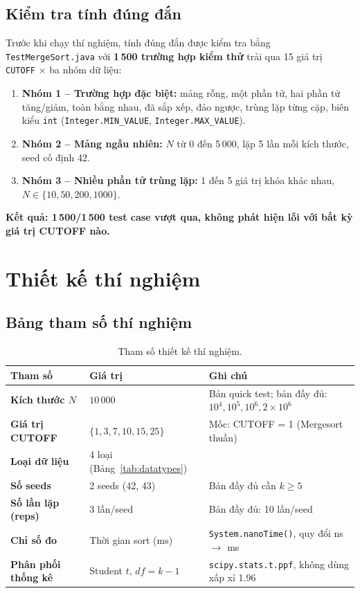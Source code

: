 \documentclass[12pt, a4paper]{article}
\begin{document}
\subsection{Kiểm tra tính đúng đắn}

Trước khi chạy thí nghiệm, tính đúng đắn được kiểm tra bằng
\texttt{TestMergeSort.java} với \textbf{1\,500 trường hợp kiểm thử} trải qua
15 giá trị \texttt{CUTOFF} $\times$ ba nhóm dữ liệu:

\begin{enumerate}
    \item \textbf{Nhóm 1 – Trường hợp đặc biệt:} mảng rỗng, một phần tử, hai
          phần tử tăng/giảm, toàn bằng nhau, đã sắp xếp, đảo ngược, trùng lặp
          từng cặp, biên kiểu \texttt{int} (\texttt{Integer.MIN\_VALUE},
          \texttt{Integer.MAX\_VALUE}).
    \item \textbf{Nhóm 2 – Mảng ngẫu nhiên:} $N$ từ 0 đến 5\,000, lặp 5 lần
          mỗi kích thước, seed cố định 42.
    \item \textbf{Nhóm 3 – Nhiều phần tử trùng lặp:} 1 đến 5 giá trị khóa
          khác nhau, $N \in \{10, 50, 200, 1000\}$.
\end{enumerate}

\noindent\textbf{Kết quả: 1\,500/1\,500 test case vượt qua, không phát hiện lỗi với
bất kỳ giá trị CUTOFF nào.}

\section{Thiết kế thí nghiệm}

\subsection{Bảng tham số thí nghiệm}

\begin{table}[H]
\centering
\caption{Tham số thiết kế thí nghiệm.}
\label{tab:design}
\renewcommand{\arraystretch}{1.3}
\begin{tabular}{>{\bfseries}l p{6cm} p{5cm}}
\toprule
Tham số & Giá trị & Ghi chú \\
\midrule
\rowcolor{rowodd}  Kích thước $N$ & $10\,000$ & Bản quick test; bản đầy đủ: $10^4, 10^5, 10^6, 2 \times 10^6$ \\
\rowcolor{roweven} Giá trị CUTOFF & $\{1, 3, 7, 10, 15, 25\}$ & Mốc: CUTOFF = 1 (Mergesort thuần) \\
\rowcolor{rowodd}  Loại dữ liệu & 4 loại (Bảng~\ref{tab:datatypes}) & \\
\rowcolor{roweven} Số seeds & 2 seeds (42, 43) & Bản đầy đủ cần $k \geq 5$ \\
\rowcolor{rowodd}  Số lần lặp (reps) & 3 lần/seed & Bản đầy đủ: 10 lần/seed \\
\rowcolor{roweven} Chỉ số đo & Thời gian sort (ms) & \texttt{System.nanoTime()}, quy đổi ns $\to$ ms \\
\rowcolor{rowodd}  Phân phối thống kê & Student $t$, $df = k - 1$ & \texttt{scipy.stats.t.ppf}, không dùng xấp xỉ 1.96 \\
\bottomrule
\end{tabular}
\end{table}
\end{document}
